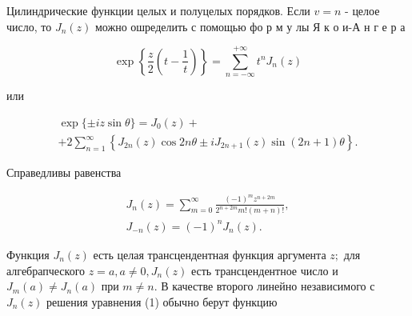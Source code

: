 \documentclass[10pt]{article}
\begin{document}
Цилиндрические функции целых и полуцелых порядков. Если $v=n$ - целое число, то $J_{n}(z)$ можно ошределить с помощью фо р м у лы Я к о и-А н г е р а



\[

\exp \left\{\frac{z}{2}\left(t-\frac{1}{t}\right)\right\}=\sum_{n=-\infty}^{+\infty} t^{n} J_{n}(z)

\]



или



\[

\begin{gathered}

\exp \{ \pm i z \sin \theta\}=J_{0}(z)+ \\

+2 \sum_{n=1}^{\infty}\left\{J_{2 n}(z) \cos 2 n \theta \pm i J_{2 n+1}(z) \sin (2 n+1) \theta\right\} .

\end{gathered}

\]



Справедливы равенства



\[

\begin{gathered}

J_{n}(z)=\sum_{m=0}^{\infty} \frac{(-1)^{m} z^{n+2 m}}{2^{n+2 m} m !(m+n) !}, \\

J_{-n}(z)=(-1)^{n} J_{n}(z) .

\end{gathered}

\]



Функция $J_{n}(z)$ есть целая трансцендентная функция аргумента $z ;$ для алгебрапческого $z=a, a \neq 0, J_{n}(z)$ есть трансцендентное число и $J_{m}(a) \neq J_{n}(a)$ при $m \neq n$. В качестве второго линейно независимого с $J_{n}(z)$ решения уравнения (1) обычно берут функцию
\end{document}
